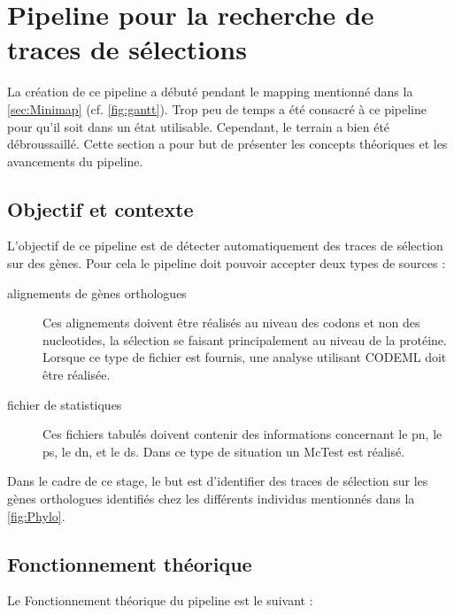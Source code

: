 \documentclass[../main]{subfiles} %
\begin{document}
\addto\extrasfrench{\protected\edef:{\unexpanded\expandafter{:}}}

\section{Pipeline pour la recherche de traces de sélections}
\label{sec:PipelineTrace}
La création de ce pipeline a débuté pendant le \gls{mapping} mentionné dans la \cref{sec:Minimap} (cf. \cref{fig:gantt}). Trop peu de temps a été consacré à ce pipeline pour qu'il soit dans un état utilisable. Cependant, le terrain a bien été débroussaillé. Cette section a pour but de présenter les concepts théoriques et les avancements du pipeline.

\subsection{Objectif et contexte}
L'objectif de ce pipeline est de détecter automatiquement des traces de sélection sur des gènes. Pour cela le pipeline doit pouvoir accepter deux types de sources :

\begin{description}
    \item[alignements de gènes \glspl{orthologue}] Ces alignements doivent être réalisés au niveau des \glspl{codon} et non des \glspl{nucleotide}, la sélection se faisant principalement au niveau de la protéine. Lorsque ce type de fichier est fournis, une analyse utilisant \gls{CODEML} doit être réalisée.
    
    \item[fichier de statistiques] Ces fichiers tabulés doivent contenir des informations concernant le \acrshort{pn}, le \acrshort{ps}, le \acrshort{dn}, et le \acrshort{ds}. Dans ce type de situation un \gls{McTest} est réalisé.
\end{description}

Dans le cadre de ce stage, le but est d'identifier des traces de sélection sur les gènes \glspl{orthologue} identifiés chez les différents individus mentionnés dans la \cref{fig:Phylo}.

\subsection{Fonctionnement théorique}
\label{sec:PipelineFoncionnement}
Le Fonctionnement théorique du pipeline est le suivant :
\end{document}
